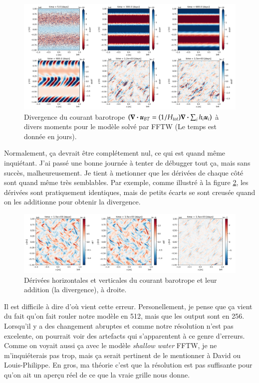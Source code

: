\documentclass[10pt]{article}
\numberwithin{equation}{section}
\newcommand{\uu}{\vb*{u}}
\begin{document}
\begin{figure}[!htpb]
\centering
\includegraphics[width=.9\linewidth]{figures/debuggage/2023_06_21divBT1_FFT.png}
\caption{\label{fig:orgcb2a671}Divergence du courant barotrope  \(\qty(\div{\uu_{BT}} = \qty(1/H_{tot}) \div{\sum_i h_i \uu_i})\) à divers moments pour le modèle solvé par FFTW (Le temps est donnée en jours).}
\end{figure}

Normalement, ça devrait être complétement nul, ce qui est quand même inquiétant.
J'ai passé une bonne journée à tenter de débugger tout ça, mais sans succès, malheureusement.
Je tient à metionner que les dérivées de chaque côté sont quand même très semblables.
Par exemple, comme illustré à la figure \ref{fig:org8575d5f}, les dérivées sont pratiquement identiques, mais de petits écarts se sont creusée quand on les additionne pour obtenir la divergence. 

\begin{figure}[!htpb]
\centering
\includegraphics[width=.9\linewidth]{figures/debuggage/2023_06_27_comp_divBT.png}
\caption{\label{fig:org8575d5f}Dérivées horizontales et verticales du courant barotrope et leur addition (la divergence), à droite.}
\end{figure}

Il est difficile à dire d'où vient cette erreur.
Personellement, je pense que ça vient du fait qu'on fait rouler notre modèle en 512, mais que les output sont en 256.
Lorsqu'il y a des changement abruptes et comme notre résolution n'est pas excelente, on pourrait voir des artefacts qui s'apparentent à ce genre d'erreurs.
Comme on voyait aussi ça avec le modèle \emph{shallow water} FFTW, je ne m'inquiéterais pas trop, mais ça serait pertinent de le mentionner à David ou Louis-Philippe.
En gros, ma théorie c'est que la résolution est pas suffisante pour qu'on ait un aperçu réel de ce que la vraie grille nous donne.
\end{document}
